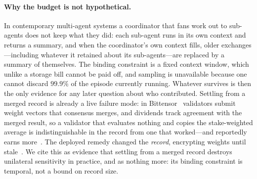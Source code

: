 \paragraph{Why the budget is not hypothetical.}
In contemporary multi-agent systems a coordinator that fans work out to
sub-agents does not keep what they did: each sub-agent runs in its own context
and returns a summary, and when the coordinator's own context fills, older
exchanges---including whatever it retained about its sub-agents---are replaced by
a summary of themselves. The binding constraint is a fixed context window, which
unlike a storage bill cannot be paid off, and sampling is unavailable because one
cannot discard $99.9\%$ of the episode currently running. Whatever survives is
then the only evidence for any later question about who contributed. Settling
from a merged record is already a live failure mode: in
Bittensor~\cite{bittensorweightcopier} validators submit weight vectors that
consensus merges, and dividends track agreement with the merged result, so a
validator that evaluates nothing and copies the stake-weighted average is
indistinguishable in the record from one that worked---and reportedly earns
more~\cite{bittensorfreeriding}. The deployed remedy changed the \emph{record},
encrypting weights until stale~\cite{bittensorcommitreveal}. We cite this as
evidence that settling from a merged record destroys unilateral sensitivity in
practice, and as nothing more: its binding constraint is temporal, not a bound on
record size.

